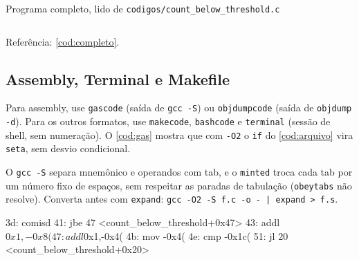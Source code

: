 \begin{codigolongo}{Programa completo, lido de \texttt{codigos/count\_below\_threshold.c}}\label{cod:completo}
  \inputminted{c}{codigos/count_below_threshold.c}
\end{codigolongo}

Referência: \cref{cod:completo}.

\FloatBarrier
\subsection{Assembly, Terminal e Makefile}

Para assembly, use \verb|gascode| (saída de \verb|gcc -S|) ou
\verb|objdumpcode| (saída de \verb|objdump -d|). Para os outros formatos, use
\verb|makecode|, \verb|bashcode| e \verb|terminal| (sessão de shell, sem
numeração). O \cref{cod:gas} mostra que com \verb|-O2| o
\verb|if| do \cref{cod:arquivo} vira \verb|seta|, sem desvio condicional.

O \verb|gcc -S| separa mnemônico e operandos com tab, e o \verb|minted| troca
cada tab por um número fixo de espaços, sem respeitar as paradas de tabulação
(\verb|obeytabs| não resolve). Converta antes com \verb|expand|:
\verb+gcc -O2 -S f.c -o - | expand > f.s+.

\begin{listing}[htbp]
  \caption{Laço de \texttt{count\_below\_threshold} com \texttt{gcc -O2 -S}}
  \label{cod:gas}
\end{listing}

\begin{listing}[htbp]
  \caption{O mesmo laço com \texttt{-O0}, via \texttt{objdump -d}: o
    \texttt{if} é o \texttt{jbe} em \texttt{0x41}}
  \label{cod:objdump}
  \begin{objdumpcode}
  3d:	comisd %
  41:	jbe    47 <count_below_threshold+0x47>
  43:	addl   $0x1,-0x8(%
  47:	addl   $0x1,-0x4(%
  4b:	mov    -0x4(%
  4e:	cmp    -0x1c(%
  51:	jl     20 <count_below_threshold+0x20>
  \end{objdumpcode}
\end{listing}

